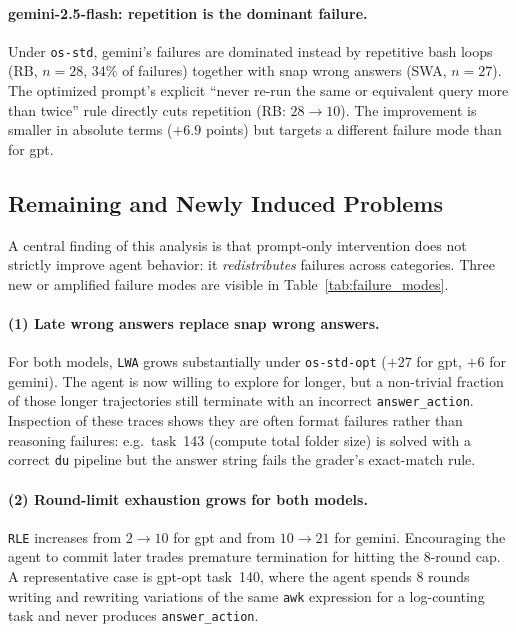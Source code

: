 \documentclass[11pt]{article}
\begin{document}
\paragraph{gemini-2.5-flash: repetition is the dominant failure.}
Under \texttt{os-std}, gemini's failures are dominated instead by repetitive bash loops (RB, $n{=}28$, $34\%$ of failures) together with snap wrong answers (SWA, $n{=}27$). The optimized prompt's explicit ``never re-run the same or equivalent query more than twice'' rule directly cuts repetition (RB: $28\to 10$). The improvement is smaller in absolute terms ($+6.9$ points) but targets a different failure mode than for gpt.

\subsection{Remaining and Newly Induced Problems}

A central finding of this analysis is that prompt-only intervention does not strictly improve agent behavior: it \emph{redistributes} failures across categories. Three new or amplified failure modes are visible in Table~\ref{tab:failure_modes}.

\paragraph{(1) Late wrong answers replace snap wrong answers.}
For both models, \texttt{LWA} grows substantially under \texttt{os-std-opt} ($+27$ for gpt, $+6$ for gemini). The agent is now willing to explore for longer, but a non-trivial fraction of those longer trajectories still terminate with an incorrect \texttt{answer\_action}. Inspection of these traces shows they are often format failures rather than reasoning failures: e.g.\ task~143 (compute total folder size) is solved with a correct \texttt{du} pipeline but the answer string fails the grader's exact-match rule.

\paragraph{(2) Round-limit exhaustion grows for both models.}
\texttt{RLE} increases from $2{\to}10$ for gpt and from $10{\to}21$ for gemini. Encouraging the agent to commit later trades premature termination for hitting the 8-round cap. A representative case is gpt-opt task~140, where the agent spends 8 rounds writing and rewriting variations of the same \texttt{awk} expression for a log-counting task and never produces \texttt{answer\_action}.
\end{document}
